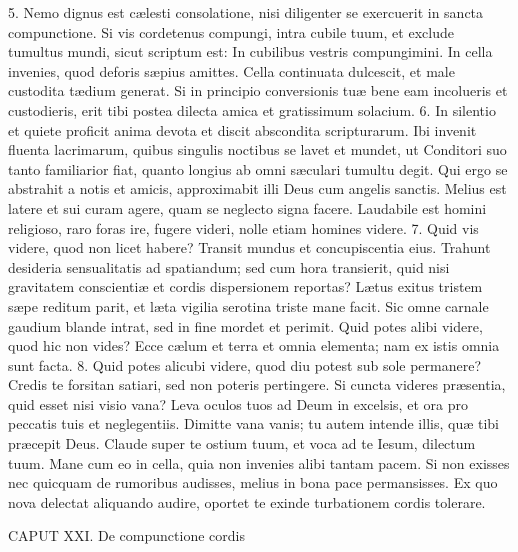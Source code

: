 \documentclass[twoside]{article}
\begin{document}
5. Nemo dignus est cælesti consolatione, nisi diligenter se exercuerit in sancta compunctione. Si vis cordetenus compungi, intra cubile tuum, et exclude tumultus mundi, sicut scriptum est: In cubilibus vestris compungimini. In cella invenies, quod deforis sæpius amittes. Cella continuata dulcescit, et male custodita tædium generat. Si in principio conversionis tuæ bene eam incolueris et custodieris, erit tibi postea dilecta amica et gratissimum solacium.
6. In silentio et quiete proficit anima devota et discit abscondita scripturarum. Ibi invenit fluenta lacrimarum, quibus singulis noctibus se lavet et mundet, ut Conditori suo tanto familiarior fiat, quanto longius ab omni sæculari tumultu degit. Qui ergo se abstrahit a notis et amicis, approximabit illi Deus cum angelis sanctis. Melius est latere et sui curam agere, quam se neglecto signa facere. Laudabile est homini religioso, raro foras ire, fugere videri, nolle etiam homines videre.
7. Quid vis videre, quod non licet habere? Transit mundus et concupiscentia eius. Trahunt desideria sensualitatis ad spatiandum; sed cum hora transierit, quid nisi gravitatem conscientiæ et cordis dispersionem reportas? Lætus exitus tristem sæpe reditum parit, et læta vigilia serotina triste mane facit. Sic omne carnale gaudium blande intrat, sed in fine mordet et perimit. Quid potes alibi videre, quod hic non vides? Ecce cælum et terra et omnia elementa; nam ex istis omnia sunt facta.
8. Quid potes alicubi videre, quod diu potest sub sole permanere? Credis te forsitan satiari, sed non poteris pertingere. Si cuncta videres præsentia, quid esset nisi visio vana? Leva oculos tuos ad Deum in excelsis, et ora pro peccatis tuis et neglegentiis. Dimitte vana vanis; tu autem intende illis, quæ tibi præcepit Deus. Claude super te ostium tuum, et voca ad te Iesum, dilectum tuum. Mane cum eo in cella, quia non invenies alibi tantam pacem. Si non exisses nec quicquam de rumoribus audisses, melius in bona pace permansisses. Ex quo nova delectat aliquando audire, oportet te exinde turbationem cordis tolerare.


CAPUT XXI.
De compunctione cordis
\end{document}
